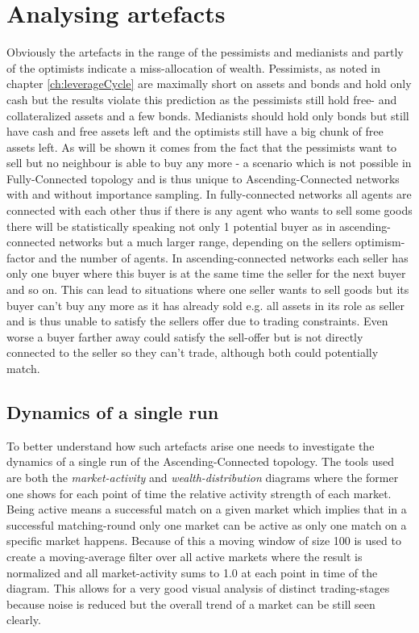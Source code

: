 \documentclass[Bachelorarbeit.tex]{subfiles}
\begin{document}
\section{Analysing artefacts}
Obviously the artefacts in the range of the pessimists and medianists and partly of the optimists indicate a miss-allocation of wealth. Pessimists, as noted in chapter \ref{ch:leverageCycle} are maximally short on assets and bonds and hold only cash but the results violate this prediction as the pessimists still hold free- and collateralized assets and a few bonds. Medianists should hold only bonds but still have cash and free assets left and the optimists still have a big chunk of free assets left. As will be shown it comes from the fact that the pessimists want to sell but no neighbour is able to buy any more - a scenario which is not possible in Fully-Connected topology and is thus unique to Ascending-Connected networks with and without importance sampling. In fully-connected networks all agents are connected with each other thus if there is any agent who wants to sell some goods there will be statistically speaking not only 1 potential buyer as in ascending-connected networks but a much larger range, depending on the sellers optimism-factor and the number of agents. In ascending-connected networks each seller has only one buyer where this buyer is at the same time the seller for the next buyer and so on. This can lead to situations where one seller wants to sell goods but its buyer can't buy any more as it has already sold e.g. all assets in its role as seller and is thus unable to satisfy the sellers offer due to trading constraints. Even worse a buyer farther away could satisfy the sell-offer but is not directly connected to the seller so they can't trade, although both could potentially match.

\subsection{Dynamics of a single run}
\label{sub:dynamics_singlerun}
To better understand how such artefacts arise one needs to investigate the dynamics of a single run of the Ascending-Connected topology. The tools used are both the \textit{market-activity} and \textit{wealth-distribution} diagrams where the former one shows for each point of time the relative activity strength of each market. Being active means a successful match on a given market which implies that in a successful matching-round only one market can be active as only one match on a specific market happens. Because of this a moving window of size 100 is used to create a moving-average filter over all active markets where the result is normalized and all market-activity sums to 1.0 at each point in time of the diagram. This allows for a very good visual analysis of distinct trading-stages because noise is reduced but the overall trend of a market can be still seen clearly.
\end{document}

